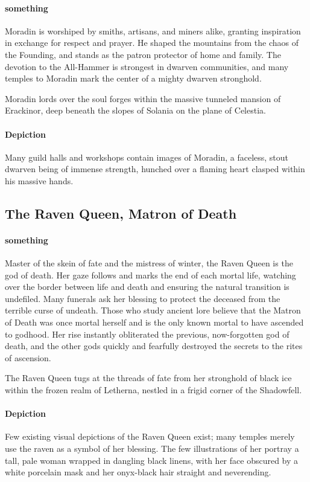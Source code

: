 \documentclass[letterpaper,twocolumn,openany,nodeprecatedcode]{dndbook}
\begin{document}
\paragraph{something}
Moradin is worshiped by smiths, artisans, and miners alike, granting inspiration in
exchange for respect and prayer. He shaped the mountains from the chaos of the Founding,
and stands as the patron protector of home and family. The devotion to the All-Hammer is
strongest in dwarven communities, and many temples to Moradin mark the center of a mighty
dwarven stronghold.

Moradin lords over the soul forges within the massive tunneled mansion of Erackinor,
deep beneath the slopes of Solania on the plane of Celestia.

\paragraph{Depiction}
Many guild halls and workshops contain images of Moradin, a faceless, stout dwarven
being of immense strength, hunched over a flaming heart clasped within his massive hands.

\subsection{The Raven Queen, Matron of Death}

\paragraph{something}
Master of the skein of fate and the mistress of winter, the Raven Queen is the god of
death. Her gaze follows and marks the end of each mortal life, watching over the border
between life and death and ensuring the natural transition is undefiled. Many funerals
ask her blessing to protect the deceased from the terrible curse of undeath. Those who
study ancient lore believe that the Matron of Death was once mortal herself and is the
only known mortal to have ascended to godhood. Her rise instantly obliterated the previous,
now-forgotten god of death, and the other gods quickly and fearfully destroyed the secrets
to the rites of ascension.

The Raven Queen tugs at the threads of fate from her stronghold of black ice within the
frozen realm of Letherna, nestled in a frigid corner of the Shadowfell.

\paragraph{Depiction}
Few existing visual depictions of the Raven Queen exist; many temples merely use the
raven as a symbol of her blessing. The few illustrations of her portray a tall, pale
woman wrapped in dangling black linens, with her face obscured by a white porcelain
mask and her onyx-black hair straight and neverending.
\end{document}
